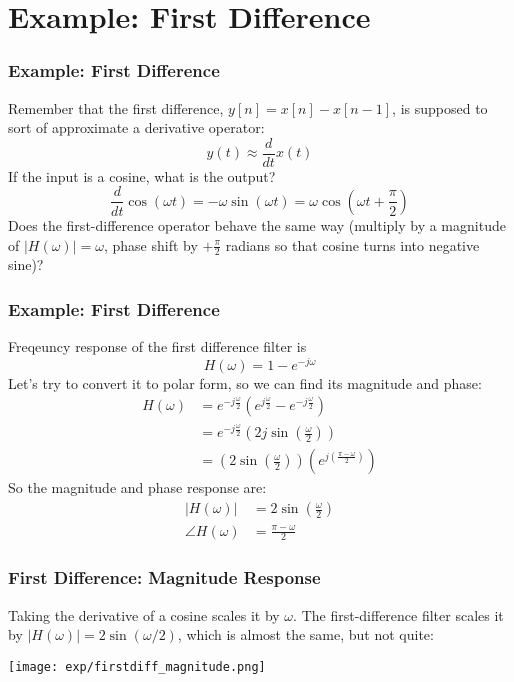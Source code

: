 \documentclass{beamer}
\begin{document}
\section[Example]{Example: First Difference}
\setcounter{subsection}{1}

\begin{frame}
  \frametitle{Example: First Difference}

  Remember that the first difference, $y[n]=x[n]-x[n-1]$, is supposed
  to sort of approximate a derivative operator:
  \[
  y(t) \approx \frac{d}{dt} x(t)
  \]
  If the input is a cosine, what is the output?
  \[
  \frac{d}{dt} \cos\left(\omega t\right) = -\omega \sin\left(\omega t\right)
  = \omega \cos\left(\omega t+\frac{\pi}{2}\right)
  \]
  Does the first-difference operator behave the same way (multiply by
  a magnitude of $|H(\omega)|=\omega$, phase shift by $+\frac{\pi}{2}$
  radians so that cosine turns into negative sine)?
\end{frame}

\begin{frame}
  \frametitle{Example: First Difference}

  Freqeuncy response of the first difference filter is
  \[
  H(\omega) = 1-e^{-j\omega}
  \]
  Let's try to convert it to polar form, so we can find its magnitude and phase:
  \begin{align*}
    H(\omega) &= e^{-j\frac{\omega}{2}} \left(e^{j\frac{\omega}{2}}-e^{-j\frac{\omega}{2}}\right)\\
    &= e^{-j\frac{\omega}{2}} \left(2j\sin\left(\frac{\omega}{2}\right)\right)\\
    &= \left(2\sin\left(\frac{\omega}{2}\right)\right)\left(e^{j\left(\frac{\pi-\omega}{2}\right)}\right)
  \end{align*}
  So the magnitude and phase response are:
  \begin{align*}
    |H(\omega)| &= 2\sin\left(\frac{\omega}{2}\right)\\
    \angle H(\omega) &= \frac{\pi-\omega}{2}
  \end{align*}
\end{frame}

\begin{frame}
  \frametitle{First Difference: Magnitude Response}
  Taking the derivative of a cosine scales it by $\omega$.  The first-difference
  filter scales it by $|H(\omega)|=2\sin(\omega/2)$, which is almost the same, but not quite:
  \centerline{\texttt{[image: exp/firstdiff\_magnitude.png]}}
\end{frame}
\end{document}
